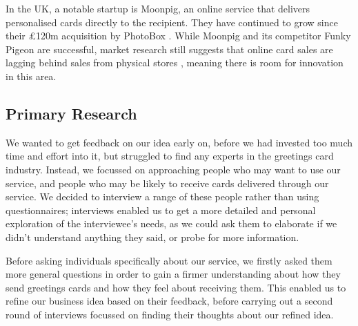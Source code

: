\documentclass[10pt,a4paper]{article}
\begin{document}
In the UK, a notable startup is Moonpig, an online service that delivers personalised cards directly to the recipient. They have continued to grow since their \pounds120m acquisition by PhotoBox \citep{bbc}. While Moonpig and its competitor Funky Pigeon are successful, market research still suggests that online card sales are lagging behind sales from physical stores \citep{mintel}, meaning there is room for innovation in this area.

\subsection*{Primary Research}
We wanted to get feedback on our idea early on, before we had invested too much time and effort into it, but struggled to find any experts in the greetings card industry. Instead, we focussed on approaching people who may want to use our service, and people who may be likely to receive cards delivered through our service. We decided to interview a range of these people rather than using questionnaires; interviews enabled us to get a more detailed and personal exploration of the interviewee's needs, as we could ask them to elaborate if we didn't understand anything they said, or probe for more information.

Before asking individuals specifically about our service, we firstly asked them more general questions in order to gain a firmer understanding about how they send greetings cards and how they feel about receiving them. This enabled us to refine our business idea based on their feedback, before carrying out a second round of interviews focussed on finding their thoughts about our refined idea.
\end{document}

